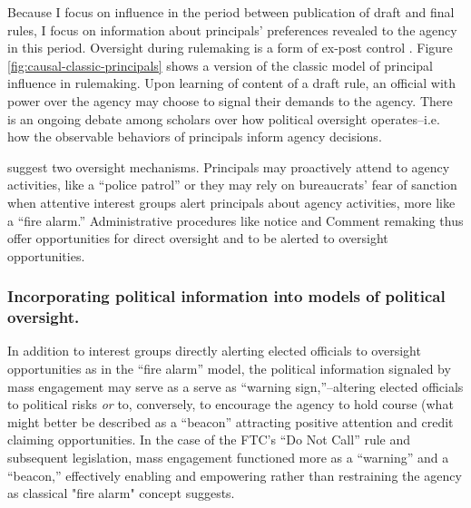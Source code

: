 
Because I focus on influence in the period between publication of draft and final rules, I focus on information about principals' preferences revealed to the agency in this period. Oversight during rulemaking is a form of ex-post control \citep{Epstein1994}. Figure \ref{fig:causal-classic-principals} shows a version of the classic model of principal influence in rulemaking. Upon learning of content of a draft rule, an official with power over the agency may choose to signal their demands to the agency. There is an ongoing debate among scholars over how political oversight operates--i.e. how the observable behaviors of principals inform agency decisions. 



\citet{McCubbins1987} suggest two oversight mechanisms. Principals may proactively attend to agency activities, like a ``police patrol'' or they may rely on bureaucrats' fear of sanction when attentive interest groups alert principals about agency activities, more like a ``fire alarm.'' Administrative procedures like notice and Comment remaking thus offer opportunities for direct oversight and to be alerted to oversight opportunities.



\subsubsection{Incorporating political information into models of political oversight.}
In addition to interest groups directly alerting elected officials to oversight opportunities as in the ``fire alarm'' model,
the political information signaled by mass engagement may serve as a serve as ``warning sign,''--altering elected officials to political risks
\emph{or} to, conversely, to encourage the agency to hold course (what might better be described as a ``beacon'' attracting positive attention and credit claiming opportunities. In the case of the FTC's ``Do Not Call'' rule and subsequent legislation, mass engagement functioned more as a ``warning'' and a ``beacon,'' effectively enabling and empowering rather than restraining the agency as classical "fire alarm" concept suggests.


